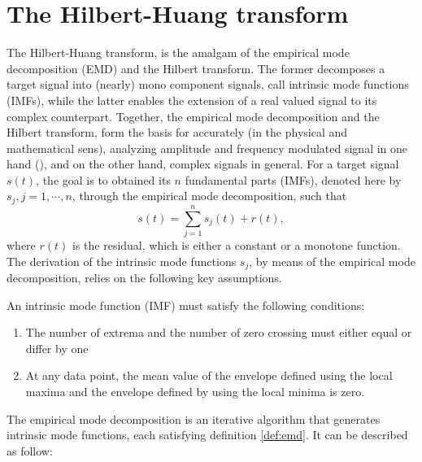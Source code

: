 \documentclass[../Main/thesis.tex]{subfiles}
\begin{document}
 \section{The Hilbert-Huang transform}
 \label{sec:emd}
 The Hilbert-Huang transform, is the amalgam of the empirical mode decomposition (EMD) and the Hilbert transform.
  The former decomposes a target signal into (nearly) mono component signals, call intrinsic mode functions (IMFs), while the latter enables the extension of a real valued signal to its complex counterpart. Together, the empirical mode decomposition and the Hilbert transform, form the basis for accurately (in the physical and mathematical sens), analyzing amplitude and frequency modulated signal in one hand (\cite{huang98}), and on the other hand, complex signals in general.
\justify
 For a target signal $s(t)$, the goal is to obtained its $n$ fundamental parts (IMFs), denoted here by $s_{j}, j =1,\cdots,n$, through the empirical mode decomposition, such that
\begin{equation}\label{eq:emd-decomposition}
s(t) = \sum_{j=1}^{n}s_{j}(t) + r(t),
\end{equation}
where $r(t)$ is the residual, which is either a constant or a monotone function. The derivation of the intrinsic mode functions $s_{j}$, by means of the empirical mode decomposition, relies on the following key assumptions.
\begin{definition}\label{def:emd}
An intrinsic mode function (IMF) must satisfy the following conditions:
\begin{enumerate}
\item The number of extrema and the number of zero crossing must either equal or differ by one 
\item At any data point, the mean value of the envelope defined using the local maxima and the envelope defined by using the local minima is zero.
\end{enumerate}
\end{definition}
The empirical mode decomposition is an iterative algorithm that generates intrinsic mode functions, each satisfying definition \ref{def:emd}. It can be described as follow:
\end{document}

